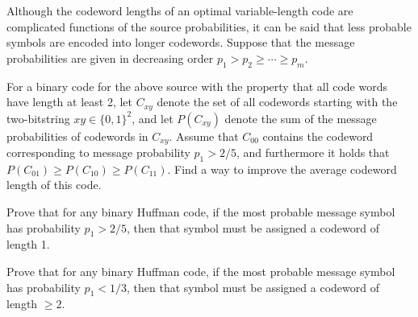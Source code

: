 \documentclass[a4paper,10pt,landscape,twocolumn]{scrartcl}
\begin{document}
\begin{exercise}
Although the codeword lengths of an optimal variable-length code are complicated functions of the source probabilities, it can be said that less probable symbols are encoded into longer codewords. Suppose that the message probabilities are given in decreasing order $p_1 > p_2 \geq \cdots \geq p_m$.
\begin{subex}
For a binary code for the above source with the property that all code words have length at least 2, let $C_{xy}$ denote the set of all codewords starting with the two-bitstring $xy \in \{0,1\}^2$, and let $P(C_{xy})$ denote the sum of the message probabilities of codewords in $C_{xy}$. Assume that $C_{00}$ contains the codeword corresponding to message probability $p_1 > 2/5$, and furthermore it holds that $P(C_{01}) \geq P(C_{10}) \geq P(C_{11})$. Find a way to improve the average codeword length of this code.
\end{subex}
\begin{subex}
	Prove that for any binary Huffman code, if the most probable message symbol has probability $p_1 > 2/5$, then that symbol must be assigned a codeword of length 1.
\end{subex}
\begin{subex}
	Prove that for any binary Huffman code, if the most probable message symbol has probability $p_1 < 1/3$, then that symbol must be assigned a codeword of length $\geq 2$.
\end{subex}
\end{exercise}
\end{document}
